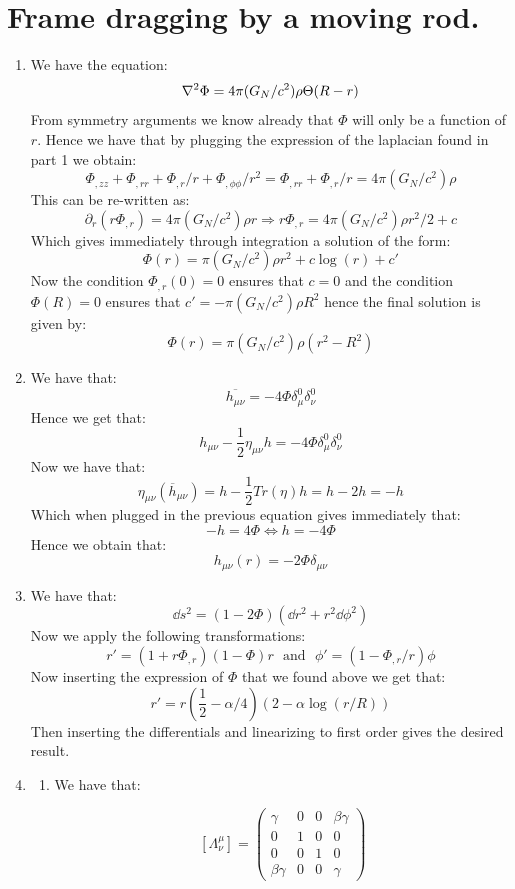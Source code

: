 \documentclass[10pt,a4paper]{article}
\begin{document}
\section{Frame dragging by a moving rod.}

\begin{enumerate}

\item We have the equation:
\[
\laplacian \Phi = 4\pi (G_N/c^2) \rho \Theta(R - r)
\]
From symmetry arguments we know already that $\Phi$ will only be a function of $r$. Hence we have that by plugging the expression of the laplacian found in part 1 we obtain:
\[
\Phi_{,zz} + \Phi_{,rr} + \Phi_{,r}/r + \Phi_{,\phi\phi}/r^2 = \Phi_{,rr} + \Phi_{,r}/r =  4 \pi (G_N/c^2) \rho
\]
This can be re-written as:
\[
\partial_r(r \Phi_{,r}) = 4 \pi (G_N /c^2)\rho r \Rightarrow r \Phi_{,r} = 4\pi (G_N/c^2) \rho r^{2}/2 + c
\]
Which gives immediately through integration a solution of the form:
\[
\Phi(r) = \pi (G_N/c^2) \rho r^2  + c \log(r) + c'
\]
Now the condition $\Phi_{,r}(0) = 0$ ensures that $c = 0$ and the condition $\Phi(R) = 0$ ensures that $c' = - \pi (G_N/c^2) \rho R^2$ hence the final solution is given by:
\[
\Phi(r) = \pi(G_N/c^2)\rho(r^2 - R^2)
\]

\item We have that:
\[
\overline{h_{\mu \nu}} = -4 \Phi \delta^0_\mu \delta^0_\nu
\]
Hence we get that:
\[
h_{\mu \nu} - \frac{1}{2} \eta_{\mu \nu} h = - 4 \Phi \delta^0_\mu \delta^0_\nu
\]
Now we have that:
\[
\eta_{\mu\nu}(\overline{h}_{\mu\nu}) = h - \frac{1}{2} Tr(\eta) h = h - 2h = - h
\]
Which when plugged in the previous equation gives immediately that:
\[
-h = 4 \Phi \Leftrightarrow h = -4 \Phi
\]
Hence we obtain that:
\[
h_{\mu \nu}(r) = - 2 \Phi \delta_{\mu \nu}
\]


\item We have that:
\[
\dd s^2 = (1 - 2 \Phi) (\dd r^2 + r^2 \dd \phi^2)
\]
Now we apply the following transformations:
\[
r' = (1 + r \Phi_{,r})(1 - \Phi) r  \mbox{~~and~~} \phi' = (1 - \Phi_{,r}/r)\phi
\]
Now inserting the expression of $\Phi$ that we found above we get that:
\[
r' = r(\frac{1}{2} - \alpha/4)(2 - \alpha \log(r/R)) 
\]
Then inserting the differentials and linearizing to first order gives the desired result.

\item
\begin{enumerate}
\item We have that:

\[
[\Lambda^\mu_{\nu}] = \begin{pmatrix}
\gamma & 0 & 0 & \beta \gamma\\
0 & 1 & 0 & 0\\
0 & 0 & 1 & 0\\
\beta \gamma & 0 & 0 & \gamma
\end{pmatrix}
\]


\end{enumerate}
\end{enumerate}
\end{document}
